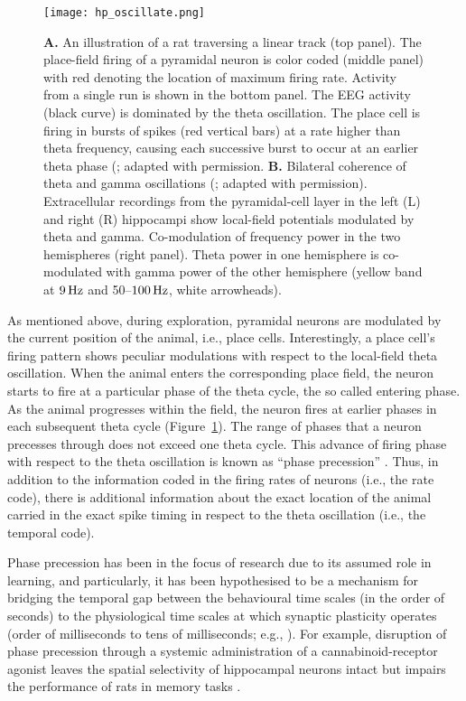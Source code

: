     \begin{figure}
      \center
      \texttt{[image: hp\_oscillate.png]}
      \caption{
        {\bf A.} An illustration of a rat traversing a linear track (top panel). The
        place-field firing of a pyramidal neuron is color coded
        (middle panel) with red denoting the location of maximum firing rate.
        Activity from a single run is shown in the bottom panel. The EEG activity
        (black curve) is dominated by the theta oscillation. The place cell is
        firing in bursts of spikes (red vertical bars) at a rate higher than theta
        frequency, causing each successive burst to occur at an earlier theta
        phase (\citealp{Huxter2003}; adapted with permission.
        {\bf B.} Bilateral coherence of theta and gamma oscillations
        (\citealp{Buzsaki2003}; adapted with permission). Extracellular
        recordings from the pyramidal-cell layer in the left (L) and right (R)
        hippocampi show local-field potentials modulated by theta and gamma.
        Co-modulation of frequency power in the two hemispheres (right
        panel). Theta power in one hemisphere is co-modulated with gamma power
        of the other hemisphere (yellow band at $9\,\rm Hz$ and 50--$100\, \rm
        Hz$, white arrowheads).
             }
    \label{fig:hp_oscillate}
    \end{figure}

    As mentioned above, during exploration, pyramidal neurons are modulated by
    the current position of the animal, i.e., place cells. Interestingly, a
    place cell's firing pattern shows peculiar modulations with respect to the
    local-field theta oscillation. When the animal enters the corresponding
    place field, the neuron starts to fire at a particular phase of the theta
    cycle, the so called entering phase. As the animal progresses within the
    field, the neuron fires at earlier phases in each subsequent theta cycle
    (Figure~\ref{fig:hp_oscillate}). The range of phases that a neuron precesses
    through does not exceed one theta cycle. This advance of firing phase with
    respect to the theta oscillation is known as ``phase precession''
    \citep{OKeefe1993}. Thus, in addition to the information coded in the
    firing rates of neurons (i.e., the rate code), there is additional
    information about the exact location of the animal carried in the exact
    spike timing in respect to the theta oscillation (i.e., the temporal code).
    
    Phase precession has been in the focus of research due to its assumed role
    in learning, and particularly, it has been hypothesised to be a mechanism
    for bridging the temporal gap between the behavioural time scales (in the
    order of seconds) to the physiological time scales at which synaptic
    plasticity operates (order of milliseconds to tens of milliseconds; e.g.,
    \citealp{Bi1998}). For example, disruption of phase precession through a
    systemic administration of a cannabinoid-receptor agonist leaves the
    spatial selectivity of hippocampal neurons intact but impairs the
    performance of rats in memory tasks \citep{Robbe2009}.
    
